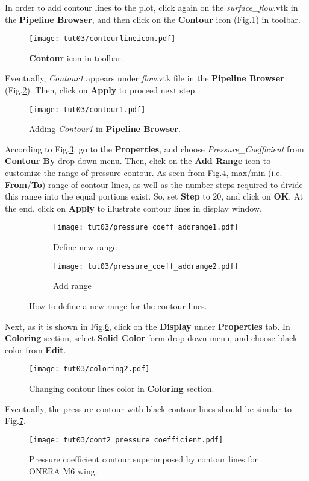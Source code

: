 In order to add contour lines to the plot, click again on the \textit{surface\_flow}.vtk in the \textbf{Pipeline Browser}, and then click on the \textbf{Contour} icon (Fig.\ref{fig:contour_icon}) in toolbar.
\begin{figure}[htbp]
    \centering
    \texttt{[image: tut03/contourlineicon.pdf]}
    \caption{\textbf{Contour} icon in toolbar.}
    \label{fig:contour_icon}
\end{figure}
Eventually, \textit{Contour1} appears under \textit{flow}.vtk file in the \textbf{Pipeline Browser} (Fig.\ref{fig:contour1}). Then, click on \textbf{Apply} to proceed next step.
\begin{figure}[htbp]
    \centering
    \texttt{[image: tut03/contour1.pdf]}
    \caption{Adding \textit{Contour1} in \textbf{Pipeline Browser}.}
    \label{fig:contour1}
\end{figure}
According to Fig.\ref{fig:contourby a}, go to the \textbf{Properties}, and choose \textit{Pressure\_Coefficient} from \textbf{Contour By} drop-down menu. Then, click on the \textbf{Add Range} icon to customize the range of pressure contour. As seen from Fig.\ref{fig:contourby b},  max/min (i.e. \textbf{From}/\textbf{To}) range of contour lines, as well as the number steps required to divide this range into the equal portions exist. So, set \textbf{Step} to 20, and click on \textbf{OK}. At the end, click on \textbf{Apply} to illustrate contour lines in display window.
\begin{figure}[htbp]
    \centering
     \begin{subfigure}[b]{.4\textwidth}
         \centering
         \texttt{[image: tut03/pressure\_coeff\_addrange1.pdf]}
         \caption{Define new range}
         \label{fig:contourby a}
     \end{subfigure}
     \hfill
     \begin{subfigure}[b]{.4\textwidth}
         \centering
         \texttt{[image: tut03/pressure\_coeff\_addrange2.pdf]}
         \caption{Add range}
         \label{fig:contourby b}
     \end{subfigure}     
    \caption{How to define a new range for the contour lines.}
    \label{fig:contourby}
\end{figure}
Next, as it is shown in Fig.\ref{fig:colorby2}, click on the \textbf{Display} under \textbf{Properties} tab. In \textbf{Coloring} section, select \textbf{Solid Color} form drop-down menu, and choose black color from \textbf{Edit}.
\begin{figure}[htbp]
    \centering
    \texttt{[image: tut03/coloring2.pdf]}
    \caption{Changing contour lines color in \textbf{Coloring} section.}
    \label{fig:colorby2}
\end{figure}
Eventually, the pressure contour with black contour lines should be similar to Fig.\ref{fig:pressure_contour_lines}.
\begin{figure}[htbp]
    \centering
    \texttt{[image: tut03/cont2\_pressure\_coefficient.pdf]}
    \caption{Pressure coefficient contour superimposed by contour lines for ONERA M6 wing.}
    \label{fig:pressure_contour_lines}
\end{figure}

